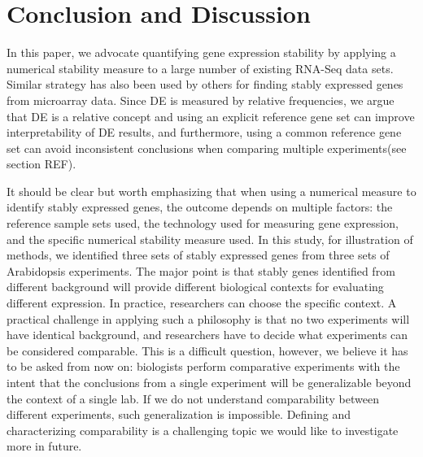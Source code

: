 \documentclass[letterpaper,12pt]{article}
\begin{document}
  \section{Conclusion and Discussion}\label{section:discussion}
In this paper, we advocate quantifying gene expression stability by applying a
numerical stability measure to a large number of existing RNA-Seq data sets.
Similar strategy has also been used by others for finding stably expressed
genes from microarray data. Since DE is measured by relative frequencies, we
argue that DE is a relative concept and using an explicit reference gene set
can improve interpretability of DE results, and furthermore,  using a common
reference gene set can avoid inconsistent conclusions when comparing multiple
experiments(see section REF).



It should be clear but worth emphasizing that when using a numerical measure
to identify stably expressed genes, the outcome depends on multiple factors:
the reference sample sets used, the technology used for measuring gene
expression, and the specific numerical stability measure used.  In this study,
for illustration of methods, we identified three sets of stably expressed
genes from three sets of Arabidopsis experiments. The major point is that
stably genes identified from different background will provide different
biological contexts for evaluating different expression. In practice,
researchers can choose the specific context. A practical challenge in applying
such a philosophy is that no two experiments will have identical background,
and researchers have to decide what experiments can be considered comparable. This
is a difficult question, however, we believe it has to be asked from now on:
biologists perform comparative experiments with the intent that the
conclusions from a single experiment will be generalizable beyond the context
of a single lab. If we do not understand comparability between different
experiments, such generalization is impossible. Defining and characterizing
comparability is a challenging topic we would like to investigate more in
future.
\end{document}
